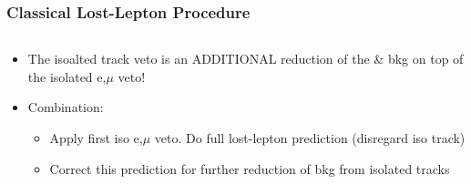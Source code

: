 \documentclass{beamer}
\begin{document}
\begin{frame}
\frametitle{Classical Lost-Lepton Procedure}
 \begin{columns}  
 \begin{column}{0.50\textwidth}
\begin{itemize}
 \item The isoalted track veto is an ADDITIONAL reduction of the \ttbar \& \wpj bkg on top of the isolated e,$\mu$ veto!
 \item Combination:
 \begin{itemize}
  \item Apply first iso e,$\mu$ veto. Do full lost-lepton prediction (disregard iso track)
  \item Correct this prediction for further reduction of bkg from isolated tracks
 \end{itemize}

\end{itemize}


\end{column}
\end{columns}
\end{frame}
\end{document}

